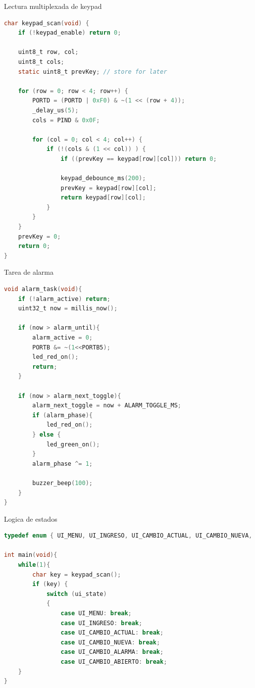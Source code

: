 Lectura multiplexada de keypad
\begin{lstlisting}[language=C, caption={Funcion de lectura multiplexada de keypad}]
char keypad_scan(void) {
	if (!keypad_enable) return 0;
	
	uint8_t row, col;
	uint8_t cols;
	static uint8_t prevKey; // store for later

	for (row = 0; row < 4; row++) {
		PORTD = (PORTD | 0xF0) & ~(1 << (row + 4));
		_delay_us(5);  
		cols = PIND & 0x0F;  

		for (col = 0; col < 4; col++) {
			if (!(cols & (1 << col)) ) {
				if ((prevKey == keypad[row][col])) return 0;
				
				keypad_debounce_ms(200);
				prevKey = keypad[row][col];
				return keypad[row][col];  
			} 
		}
	}
	prevKey = 0;
	return 0; 
}
\end{lstlisting}

Tarea de alarma
\begin{lstlisting}[language=C, caption={Tarea de alarma}]
 void alarm_task(void){
	if (!alarm_active) return;
	uint32_t now = millis_now();
	
	if (now > alarm_until){
		alarm_active = 0;
		PORTB &= ~(1<<PORTB5);
		led_red_on();
		return;
	}
	
	if (now > alarm_next_toggle){
		alarm_next_toggle = now + ALARM_TOGGLE_MS;
		if (alarm_phase){
			led_red_on();
		} else {
			led_green_on();
		}
		alarm_phase ^= 1;
		
		buzzer_beep(100);
	}
}
\end{lstlisting}

Logica de estados
\begin{lstlisting}[language=C, caption={Logica de estados}]
typedef enum { UI_MENU, UI_INGRESO, UI_CAMBIO_ACTUAL, UI_CAMBIO_NUEVA, UI_ABIERTO, UI_ALARMA } ui_state_t;

int main(void){
    while(1){
        char key = keypad_scan();
		if (key) {
			switch (ui_state)
			{
                case UI_MENU: break;
                case UI_INGRESO: break;
                case UI_CAMBIO_ACTUAL: break;
                case UI_CAMBIO_NUEVA: break;
                case UI_CAMBIO_ALARMA: break;
                case UI_CAMBIO_ABIERTO: break;
    }
}
\end{lstlisting}



